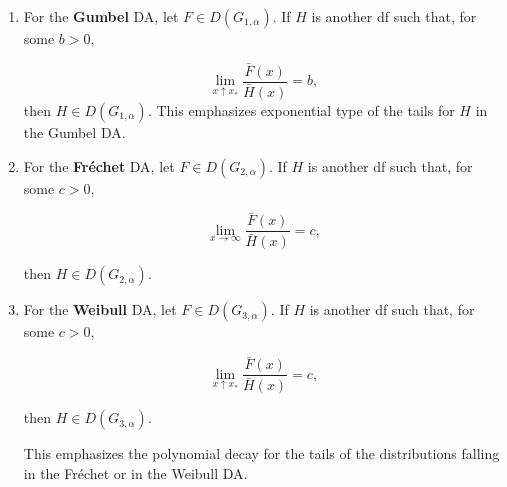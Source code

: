 \begin{enumerate}
	\item For the \textbf{Gumbel} DA,  let $F\in D(G_{1,\alpha})$. If $H$ is another df such that, for some $b>0$, 
	
	\begin{equation}
	\displaystyle{\lim_{ x \uparrow x_*}} \frac{\bar{F}(x)}{\bar{H}(x)}=b,
	\end{equation}
	then $H\in D(G_{1,\alpha})$. This emphasizes exponential type of the  tails for $H$ in the Gumbel DA.
	
	\item For the \textbf{Fréchet} DA, let $F\in D(G_{2,\alpha})$. If $H$ is another df such that, for some $c>0$, 
	
	\begin{equation}
	\displaystyle{\lim_{ x \to\infty}} \frac{\bar{F}(x)}{\bar{H}(x)}=c,
	\end{equation}
	
	then $H\in D(G_{2,\alpha})$.
	
	\item For the \textbf{Weibull} DA,  let $F\in D(G_{3,\alpha})$. If $H$ is another df such that, for some $c>0$, 
	
	\begin{equation}
	\displaystyle{\lim_{ x  \uparrow  x_*}} \frac{\bar{F}(x)}{\bar{H}(x)}=c,
	\end{equation}
	
	then $H\in D(G_{3,\alpha})$.
	
	This emphasizes the polynomial decay for the tails of the distributions falling in the Fréchet or in the Weibull DA.
\end{enumerate}



